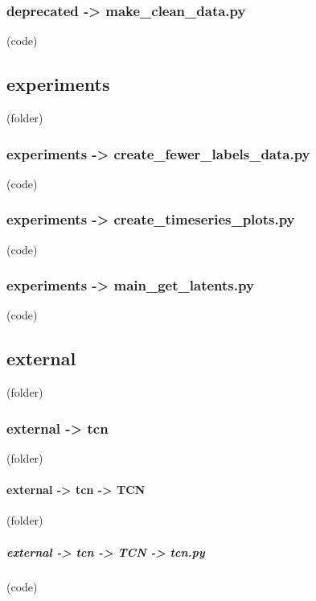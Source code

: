 \begin{myparindent}{0pt}
\noindent\subsubsection[make\_clean\_data.py]{deprecated -> make\_clean\_data.py} (code)

\noindent\subsection[experiments]{experiments} (folder)
\noindent\subsubsection[create\_fewer\_labels\_data.py]{experiments -> create\_fewer\_labels\_data.py} (code)

\noindent\subsubsection[create\_timeseries\_plots.py]{experiments -> create\_timeseries\_plots.py} (code)

\noindent\subsubsection[main\_get\_latents.py]{experiments -> main\_get\_latents.py} (code)

\noindent\subsection[external]{external} (folder)
\noindent\subsubsection[tcn]{external -> tcn} (folder)
\noindent\paragraph[TCN]{external -> tcn -> TCN} (folder)
\noindent\subparagraph[tcn.py]{external -> tcn -> TCN -> tcn.py} (code)


\end{myparindent}
